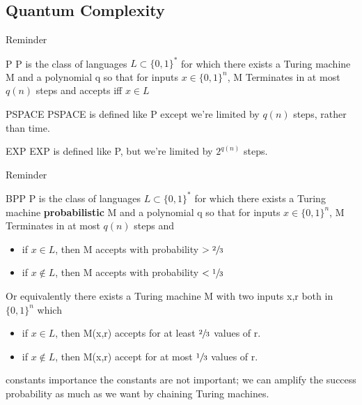     \subsection {Quantum Complexity}
    \begin{frame}{Reminder}
        \begin{block}{P}
            P is the class of languages $L \subset \{0,1\}^*$ for which there exists a Turing machine M and a polynomial q
            so that for inputs $x \in \{0,1\}^n$, M Terminates in at most $q(n)$ steps and accepts iff $x \in L$
        \end{block}
        \pause
        \begin{block}{PSPACE}
            PSPACE is defined like P except we're limited by $q(n)$ steps, rather than time.
        \end{block}
        \pause
        \begin{block}{EXP}
            EXP is defined like P, but we're limited by $2^{q(n)}$ steps.
        \end{block}
        
    \end{frame}
    \begin{frame}{Reminder}
        \begin{block}{BPP}
            P is the class of languages $L \subset \{0,1\}^*$ for which there exists a Turing machine \textbf{probabilistic} M and a polynomial q
            so that for inputs $x \in \{0,1\}^n$, M Terminates in at most $q(n)$ steps and
            \begin{itemize}
                \item if $x \in L$, then M accepts with probability $> \sfrac{2}{3}$
                \item if $x \notin L$, then M accepts with probability $< \sfrac{1}{3}$
            \end{itemize}
            Or equivalently there exists a Turing machine M with two inputs x,r both in $\{0,1\}^n$
            which
            \begin{itemize}
                \item if $x \in L$, then M(x,r) accepts for at least $\sfrac{2}{3}$ values of r.
                \item if $x \notin L$, then M(x,r) accept for at most $\sfrac{1}{3}$ values of r.
            \end{itemize}
            \pause
            \begin{alertblock}{constants importance}
                the constants are not important; we can amplify the success probability as much as we want by chaining Turing machines.
            \end{alertblock}
        \end{block}
    \end{frame}
